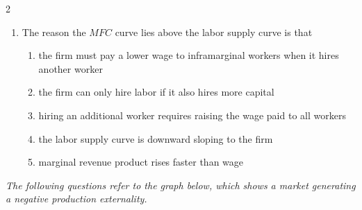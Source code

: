 \documentclass[10pt]{article}
\newenvironment{choiceslist}
  {\begin{enumerate}[label=(\Alph*), leftmargin=1.55em, itemsep=0.1em, topsep=0.15em, parsep=0pt]}
  {\end{enumerate}}
\newenvironment{stimulus}
  {\begin{center}\begin{minipage}{0.97\columnwidth}\footnotesize\itshape\setlength{\tabcolsep}{3pt}\renewcommand{\arraystretch}{0.96}}
  {\end{minipage}\end{center}}
\begin{document}
\begin{multicols*}{2}
\begin{enumerate}[resume*=curveq, leftmargin=*, itemsep=0.8em, topsep=0.18em, parsep=0pt]
\begin{choiceslist}
\item rises above $L_c$
\item becomes zero because the wage is above $W_m$
\end{choiceslist}
\item The reason the $MFC$ curve lies above the labor supply curve is that
\begin{choiceslist}
\item the firm must pay a lower wage to inframarginal workers when it hires another worker
\item the firm can only hire labor if it also hires more capital
\item hiring an additional worker requires raising the wage paid to all workers
\item the labor supply curve is downward sloping to the firm
\item marginal revenue product rises faster than wage
\end{choiceslist}
\end{enumerate}
\begin{stimulus}
The following questions refer to the graph below, which shows a market generating a negative production externality.


\end{stimulus}
\end{multicols*}
\end{document}
